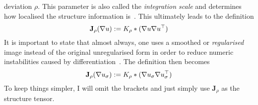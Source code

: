 deviation $\rho$. This parameter is also
called the \textit{integration scale} and determines how localised the structure information
is~\cite{ipcv}.
This ultimately leads to the definition
\begin{equation}
    \mathbf{J}_\rho(\mathbf{\nabla} u) := K_\rho * (\mathbf{\nabla} u\mathbf{\nabla} u^\top)
\end{equation}
It is important to state that almost always, one uses a smoothed or \textit{regularised} image instead of the
original unregularised form in order to reduce numeric instabilities caused by
differentiation~\cite{ipcv}. The definition then becomes
\begin{equation}
    \mathbf{J}_\rho(\mathbf{\nabla} u_\sigma) := K_\rho * (\mathbf{\nabla} u_\sigma\mathbf{\nabla}
    u_\sigma^\top)\label{def:StructTensor}
\end{equation}
To keep things simpler, I will omit the brackets and just simply use $\mathbf{J}_\rho$ as the
structure tensor.\\
